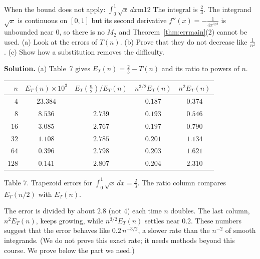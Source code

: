 \documentclass[11pt]{article}
\begin{document}
\begin{exmp}{When the bound does not apply: $\int_0^1\sqrt x\,dx$}{m12}
The integral is $\frac23$. The integrand $\sqrt x$ is continuous on $[0,1]$ but its second derivative $f''(x)=-\frac1{4x^{3/2}}$ is unbounded near $0$, so there is no $M_2$ and Theorem~\ref{thm:errmain}(2) cannot be used. (a) Look at the errors of $T(n)$. (b) Prove that they do not decrease like $\frac1{n^2}$. (c) Show how a substitution removes the difficulty.

\textbf{Solution.} (a) Table~7 gives $E_T(n)=\frac23-T(n)$ and its ratio to powers of $n$.
\begin{center}
\begin{tabular}{rcccc}
\toprule $n$ & $E_T(n)\times10^3$ & $E_T(\frac n2)/E_T(n)$ & $n^{3/2}E_T(n)$ & $n^2E_T(n)$\\\midrule
$4$ & $23.384$ & & $0.187$ & $0.374$\\
$8$ & $8.536$ & $2.739$ & $0.193$ & $0.546$\\
$16$ & $3.085$ & $2.767$ & $0.197$ & $0.790$\\
$32$ & $1.108$ & $2.785$ & $0.201$ & $1.134$\\
$64$ & $0.396$ & $2.798$ & $0.203$ & $1.621$\\
$128$ & $0.141$ & $2.807$ & $0.204$ & $2.310$\\\bottomrule
\end{tabular}
\end{center}
\begin{center}\small Table 7. Trapezoid errors for $\int_0^1\sqrt x\,dx=\frac23$. The ratio column compares $E_T(n/2)$ with $E_T(n)$.\end{center}
The error is divided by about $2.8$ (not $4$) each time $n$ doubles. The last column, $n^2E_T(n)$, keeps growing, while $n^{3/2}E_T(n)$ settles near $0.2$. These numbers suggest that the error behaves like $0.2\,n^{-3/2}$, a slower rate than the $n^{-2}$ of smooth integrands. (We do not prove this exact rate; it needs methods beyond this course. We prove below the part we need.)


\end{exmp}
\end{document}

